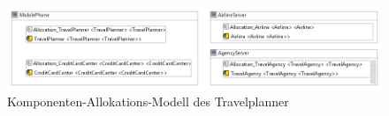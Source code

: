 \begin{figure}[htp]
	\centering
  	\includegraphics[width=1\textwidth]{images/travelplanner_allocation.png}
	\caption{Komponenten-Allokations-Modell des Travelplanner}
	\label{sec:appendix:travelplanner:allocation}
\end{figure}

